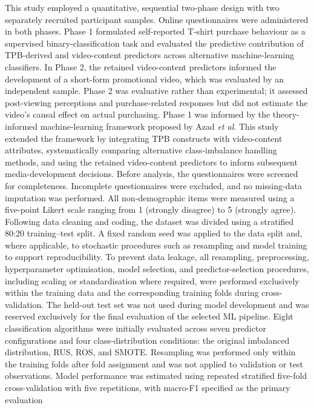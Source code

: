 \documentclass[jtaer,article,submit,moreauthors]{Definitions/mdpi}
\begin{document}
This study employed a quantitative, sequential two-phase design with two separately recruited participant samples. Online questionnaires were administered in both phases. Phase 1 formulated self-reported T-shirt purchase behaviour as a supervised binary-classification task and evaluated the predictive contribution of TPB-derived and video-content predictors across alternative machine-learning classifiers. In Phase 2, the retained video-content predictors informed the development of a short-form promotional video, which was evaluated by an independent sample. Phase 2 was evaluative rather than experimental; it assessed post-viewing perceptions and purchase-related responses but did not estimate the video’s causal effect on actual purchasing.
Phase 1 was informed by the theory-informed machine-learning framework proposed by Azad \textit{et al}. \cite{Azad2023} This study extended the framework by integrating TPB constructs with video-content attributes, systematically comparing alternative class-imbalance handling methods, and using the retained video-content predictors to inform subsequent media-development decisions.
Before analysis, the questionnaires were screened for completeness. Incomplete questionnaires were excluded, and no missing-data imputation was performed. All non-demographic items were measured using a five-point Likert scale ranging from 1 (strongly disagree) to 5 (strongly agree).
Following data cleaning and coding, the dataset was divided using a stratified 80:20 training--test split. A fixed random seed was applied to the data split and, where applicable, to stochastic procedures such as resampling and model training to support reproducibility. To prevent data leakage, all resampling, preprocessing, hyperparameter optimisation, model selection, and predictor-selection procedures, including scaling or standardisation where required, were performed exclusively within the training data and the corresponding training folds during cross-validation. The held-out test set was not used during model development and was reserved exclusively for the final evaluation of the selected ML pipeline.
Eight classification algorithms were initially evaluated across seven
predictor configurations and four class-distribution conditions: the
original imbalanced distribution, RUS, ROS, and SMOTE. Resampling was
performed only within the training folds after fold assignment and
was not applied to validation or test observations. Model performance
was estimated using repeated stratified five-fold cross-validation with
five repetitions, with macro-F1 specified as the primary evaluation
\end{document}

